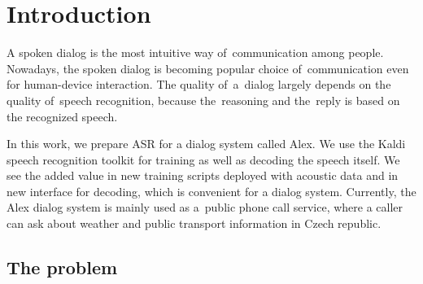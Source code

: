 \chapter{Introduction}
\label{chap:intro}

% 
% 
% 

A spoken dialog is the most intuitive way of~communication among people. Nowadays, the spoken dialog is becoming popular 
choice of~communication even for human-device interaction. The quality of~a~dialog largely depends on the quality 
of~speech recognition, because the~reasoning and the~reply is based on the recognized speech. 

In this work, we prepare \acl{ASR} for a dialog system called Alex. 
We use the Kaldi\cite{povey2011kaldi} speech recognition toolkit for training as well as decoding the speech itself.
We see the added value in new training scripts deployed with acoustic data
and in new interface for decoding, which is convenient for a dialog system. 
Currently, the Alex dialog system is mainly used as a~public phone call service,
where a caller can ask about weather and public transport information in Czech republic.

\section{The problem} 
\label{sec:problem}

